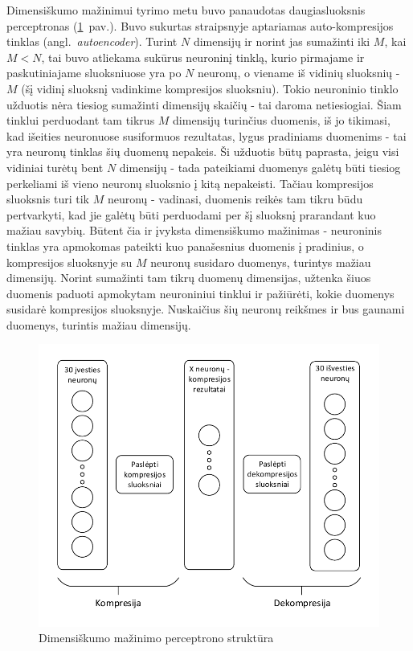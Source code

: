 \documentclass{VUMIFPSbakalaurinis}
\begin{document}
Dimensiškumo mažinimui tyrimo metu buvo panaudotas daugiasluoksnis perceptronas (\ref{fig:compression_perceptron}~pav.).
Buvo sukurtas \cite[505~psl.]{autoencoder} straipsnyje aptariamas auto-kompresijos tinklas (angl.~\textit{autoencoder}).
Turint $N$ dimensijų ir norint jas sumažinti iki $M$, kai $M < N$, tai buvo atliekama sukūrus neuroninį tinklą, kurio pirmajame ir paskutiniajame sluoksniuose yra po $N$ neuronų, o viename iš vidinių sluoksnių - $M$ (šį vidinį sluoksnį vadinkime kompresijos sluoksniu).
Tokio neuroninio tinklo užduotis nėra tiesiog sumažinti dimensijų skaičių - tai daroma netiesiogiai.
Šiam tinklui perduodant tam tikrus $M$ dimensijų turinčius duomenis, iš jo tikimasi, kad išeities neuronuose susiformuos rezultatas, lygus pradiniams duomenims - tai yra neuronų tinklas šių duomenų nepakeis.
Ši užduotis būtų paprasta, jeigu visi vidiniai turėtų bent $N$ dimensijų - tada pateikiami duomenys galėtų būti tiesiog perkeliami iš vieno neuronų sluoksnio į kitą nepakeisti.
Tačiau kompresijos sluoksnis turi tik $M$ neuronų - vadinasi, duomenis reikės tam tikru būdu pertvarkyti, kad jie galėtų būti perduodami per šį sluoksnį prarandant kuo mažiau savybių.
Būtent čia ir įvyksta dimensiškumo mažinimas - neuroninis tinklas yra apmokomas pateikti kuo panašesnius duomenis į pradinius, o kompresijos sluoksnyje su $M$ neuronų susidaro duomenys, turintys mažiau dimensijų.
Norint sumažinti tam tikrų duomenų dimensijas, užtenka šiuos duomenis paduoti apmokytam neuroniniui tinklui ir pažiūrėti, kokie duomenys susidarė kompresijos sluoksnyje.
Nuskaičius šių neuronų reikšmes ir bus gaunami duomenys, turintis mažiau dimensijų.

\begin{figure}
	\includegraphics[scale=0.75]{diagrams/compression_perceptron}
	\caption{Dimensiškumo mažinimo perceptrono struktūra}
	\label{fig:compression_perceptron}
\end{figure}
\end{document}
